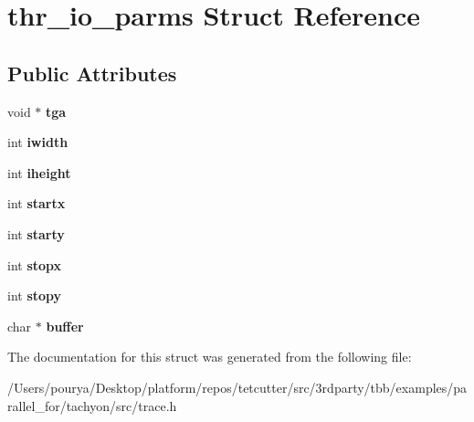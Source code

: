\hypertarget{structthr__io__parms}{}\section{thr\+\_\+io\+\_\+parms Struct Reference}
\label{structthr__io__parms}
\subsection*{Public Attributes}
\begin{DoxyCompactItemize}
\item 
\hypertarget{structthr__io__parms_ac44a7542449840be9d1c2100b59dc49f}{}void $\ast$ {\bfseries tga}\label{structthr__io__parms_ac44a7542449840be9d1c2100b59dc49f}

\item 
\hypertarget{structthr__io__parms_a9e8d184322d3482a5517ef4be6c865c9}{}int {\bfseries iwidth}\label{structthr__io__parms_a9e8d184322d3482a5517ef4be6c865c9}

\item 
\hypertarget{structthr__io__parms_adca62151c5a9b403ca8e662e2d9a58ba}{}int {\bfseries iheight}\label{structthr__io__parms_adca62151c5a9b403ca8e662e2d9a58ba}

\item 
\hypertarget{structthr__io__parms_ac7327d460bed143618d5f6826dc0b872}{}int {\bfseries startx}\label{structthr__io__parms_ac7327d460bed143618d5f6826dc0b872}

\item 
\hypertarget{structthr__io__parms_af1846ffefffc14a77562a48d9a584d90}{}int {\bfseries starty}\label{structthr__io__parms_af1846ffefffc14a77562a48d9a584d90}

\item 
\hypertarget{structthr__io__parms_aa612fdbe00ee136a5cae540a7b683086}{}int {\bfseries stopx}\label{structthr__io__parms_aa612fdbe00ee136a5cae540a7b683086}

\item 
\hypertarget{structthr__io__parms_a70777c7aadc583f5c8759546df02a654}{}int {\bfseries stopy}\label{structthr__io__parms_a70777c7aadc583f5c8759546df02a654}

\item 
\hypertarget{structthr__io__parms_a906f8756f259021a898ccae84a7ff944}{}char $\ast$ {\bfseries buffer}\label{structthr__io__parms_a906f8756f259021a898ccae84a7ff944}

\end{DoxyCompactItemize}


The documentation for this struct was generated from the following file\+:\begin{DoxyCompactItemize}
\item 
/\+Users/pourya/\+Desktop/platform/repos/tetcutter/src/3rdparty/tbb/examples/parallel\+\_\+for/tachyon/src/trace.\+h\end{DoxyCompactItemize}
